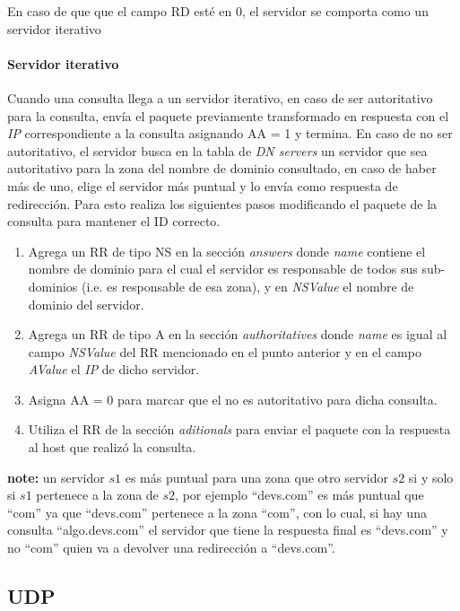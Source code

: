 \documentclass[10pt,a4paper]{article}
\begin{document}
En caso de que que el campo RD esté en 0, el servidor se comporta como un servidor iterativo \\

\paragraph{Servidor iterativo}

Cuando una consulta llega a un servidor iterativo, en caso de ser autoritativo para la consulta, envía el paquete previamente transformado en respuesta con el \textit{IP} correspondiente a la consulta asignando AA = 1 y termina. En caso de no ser autoritativo, el servidor busca en la tabla de \textit{DN servers} un servidor que sea autoritativo para la zona del nombre de dominio consultado, en caso de haber más de uno, elige el servidor más puntual y lo envía como respuesta de redirección. Para esto realiza los siguientes pasos modificando el paquete de la consulta para mantener el ID correcto.

\begin{enumerate}
\item Agrega un RR de tipo NS en la sección \textit{answers} donde \textit{name} contiene el nombre de dominio para el cual el servidor es responsable de todos sus sub-dominios (i.e. es responsable de esa zona), y en \textit{NSValue} el nombre de dominio del servidor.
\item Agrega un RR de tipo A en la sección \textit{authoritatives} donde \textit{name} es igual al campo \textit{NSValue} del RR mencionado en el punto anterior y en el campo \textit{AValue} el \textit{IP} de dicho servidor.
\item Asigna AA = 0 para marcar que el no es autoritativo para dicha consulta.
\item Utiliza el RR de la sección \textit{aditionals} para enviar el paquete con la respuesta al host que realizó la consulta.
\end{enumerate}

\textbf{note: } un servidor $s1$ es más puntual para una zona que otro servidor $s2$ si y solo si $s1$ pertenece a la zona de $s2$, por ejemplo ``devs.com'' es más puntual que ``com'' ya que ``devs.com'' pertenece a la zona ``com'', con lo cual, si hay una consulta ``algo.devs.com'' el servidor que tiene la respuesta final es ``devs.com'' y no ``com'' quien va a devolver una redirección a ``devs.com''.

\subsection{UDP}
\end{document}
